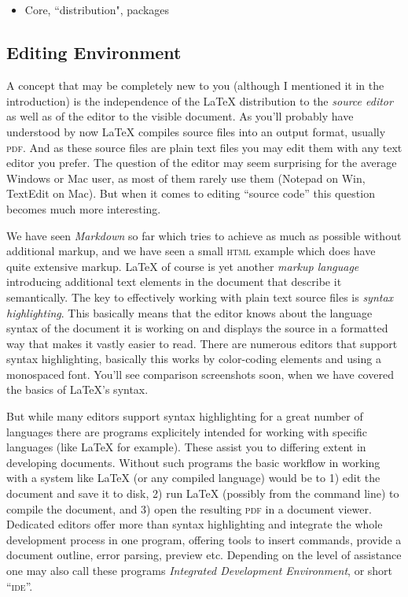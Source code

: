 \documentclass[../../LilyPond-Tutorials]{subfiles}
\begin{document}
\subsection*{}

\begin{itemize}
\item Core, “distribution", packages
\end{itemize}

\subsection*{Editing Environment}
A concept that may be completely new to you (although I mentioned it in the introduction) is the independence of the \LaTeX{} distribution to the \textit{source editor} as well as of the editor to the visible document.
As you'll probably have understood by now \LaTeX{} compiles source files into an output format, usually \textsc{pdf}.
And as these source files are plain text files you may edit them with any text editor you prefer.
The question of the editor may seem surprising for the average Windows or Mac user, as most of them rarely use them (Notepad on Win, TextEdit on Mac).
But when it comes to editing “source code” this question becomes much more interesting.

We have seen \textit{Markdown} so far which tries to achieve as much as possible without additional markup, and we have seen a small \textsc{html} example which does have quite extensive markup.
\LaTeX{} of course is yet another \textit{markup language} introducing additional text elements in the document that describe it semantically.
The key to effectively working with plain text source files is \textit{syntax highlighting}.
This basically means that the editor knows about the language syntax of the document it is working on and displays the source in a formatted way that makes it vastly easier to read.
There are numerous editors that support syntax highlighting, basically this works by color-coding elements and using a monospaced font.
You'll see comparison screenshots soon, when we have covered the basics of \LaTeX's syntax.

But while many editors support syntax highlighting for a great number of languages there are programs explicitely intended for working with specific languages (like \LaTeX{} for example).
These assist you to differing extent in developing documents.
Without such programs the basic workflow in working with a system like \LaTeX{} (or any compiled language) would be to 1) edit the document and save it to disk, 2) run \LaTeX{} (possibly from the command line) to compile the document, and 3) open the resulting \textsc{pdf} in a document viewer.
Dedicated editors offer more than syntax highlighting and integrate the whole development process in one program, offering tools to insert commands, provide a document outline, error parsing, preview etc.
Depending on the level of assistance one may also call these programs \textit{Integrated Development Environment}, or short “\textsc{ide}”.
\end{document}
